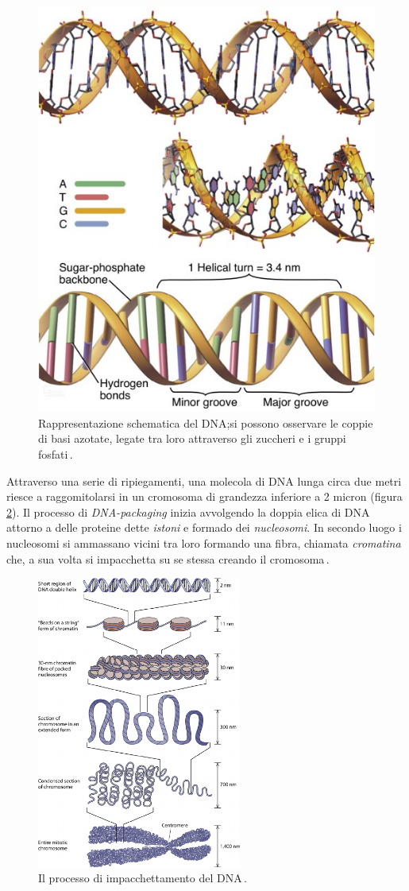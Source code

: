 \begin{figure}[b!]
    \centering
    \includegraphics[width=.5\textwidth]{assets/dna.jpg}
    \caption[Rappresentazione schematica del DNA.]{Rappresentazione schematica del DNA;\@ si possono osservare le coppie di basi azotate, legate tra loro attraverso gli zuccheri e i gruppi fosfati\,\cite{pollard2022cell}.}\label{fig:dna}
\end{figure}

Attraverso una serie di ripiegamenti, una molecola di DNA lunga circa due metri riesce a raggomitolarsi in un cromosoma di grandezza inferiore a 2 micron (figura\,\ref{fig:dna-packaging}). Il processo di \textit{DNA-packaging} inizia avvolgendo la doppia elica di DNA attorno a delle proteine dette \textsl{istoni} e formado dei \textsl{nucleosomi}. In secondo luogo i nucleosomi si ammassano vicini tra loro formando una fibra, chiamata \textsl{cromatina} che, a sua volta si impacchetta su se stessa creando il cromosoma\,\cite{jansen2011nucleosome, zheng2010packaging}.

\begin{figure}[b!]
    \centering
    \includegraphics[width=0.6\textwidth]{assets/dna-packaging.png}
    \caption[Il processo di impacchettamento del DNA.]{Il processo di impacchettamento del DNA\,\cite{jansen2011nucleosome}.}\label{fig:dna-packaging}
\end{figure}

